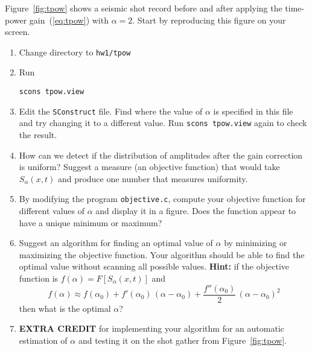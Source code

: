 
Figure~\ref{fig:tpow} shows a seismic shot record before and after
applying the time-power gain~(\ref{eq:tpow}) with $\alpha=2$. Start
by reproducing this figure on your screen.

\begin{enumerate}
\item Change directory to \verb#hw1/tpow#
\item Run
\begin{verbatim}
scons tpow.view
\end{verbatim}
\item Edit the \texttt{SConstruct} file. Find where the value of
  $\alpha$ is specified in this file and try changing it to a
  different value. Run \texttt{scons tpow.view} again to check the result.
\item How can we detect if the distribution of amplitudes after
  the gain correction is uniform? Suggest a measure (an objective
  function) that would take $S_\alpha(x,t)$ and produce one number that
  measures uniformity.
\item By modifying the program \texttt{objective.c}, compute your objective 
  function for different values of $\alpha$ and display it in a figure. 
  Does the function appear to have a unique minimum or maximum?

\lstset{language=c,numbers=left,numberstyle=\tiny,showstringspaces=false}


\item Suggest an algorithm for finding an optimal value of $\alpha$ by
  minimizing or maximizing the objective function. Your algorithm
  should be able to find the optimal value without scanning all
  possible values. \textbf{Hint:} if the objective function is
  $f(\alpha)=F[S_\alpha(x,t)]$ and 
\begin{equation}
\label{alpha}                      
f(\alpha) \approx f(\alpha_0) + 
  f'(\alpha_0)\,(\alpha-\alpha_0) + \frac{f''(\alpha_0)}{2}\,(\alpha-\alpha_0)^2
\end{equation}
then what is the optimal $\alpha$?
\item \textbf{EXTRA CREDIT} for implementing your algorithm for an automatic 
estimation of $\alpha$ and testing it on the shot gather from
Figure~\ref{fig:tpow}.

\end{enumerate}

